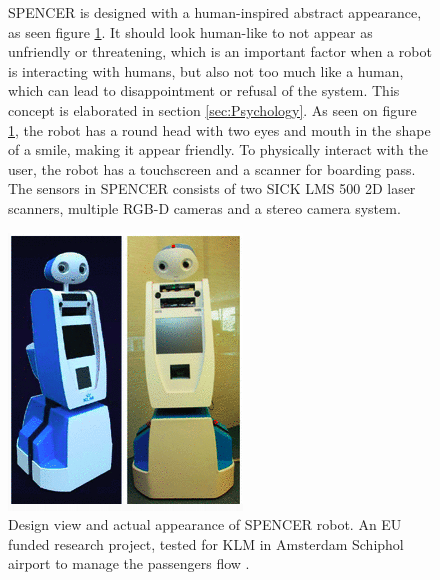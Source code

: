 \begin{figure}[H]
    \centering
    \begin{minipage}[b]{0.485\linewidth}
        SPENCER is designed with a human-inspired abstract appearance, as seen figure \ref{fig:SPENCER_design}. It should look human-like to not appear as unfriendly or threatening, which is an important factor when a robot is interacting with humans, but also not too much like a human, which can lead to disappointment or refusal of the system. This concept is elaborated in section \ref{sec:Psychology}.
        As seen on figure \ref{fig:SPENCER_design}, the robot has a round head with two eyes and mouth in the shape of a smile, making it appear friendly.
        To physically interact with the user, the robot has a touchscreen and a scanner for boarding pass. The sensors in SPENCER consists of two SICK LMS 500 2D laser scanners, multiple RGB-D cameras and a stereo camera system.
    \end{minipage}
    \hspace{0.2cm}
    \begin{minipage}[b]{0.48\linewidth}
        \centering
        \includegraphics[width=\textwidth]{figures/SPENCERpic.png}
        \caption{Design view and actual appearance of SPENCER robot\cite{SPENCER_paper}. An EU funded research project, tested for KLM in Amsterdam Schiphol airport to manage the passengers flow \cite{SPENCERCITE}. }
        \label{fig:SPENCER_design}
    \end{minipage}
\end{figure}

